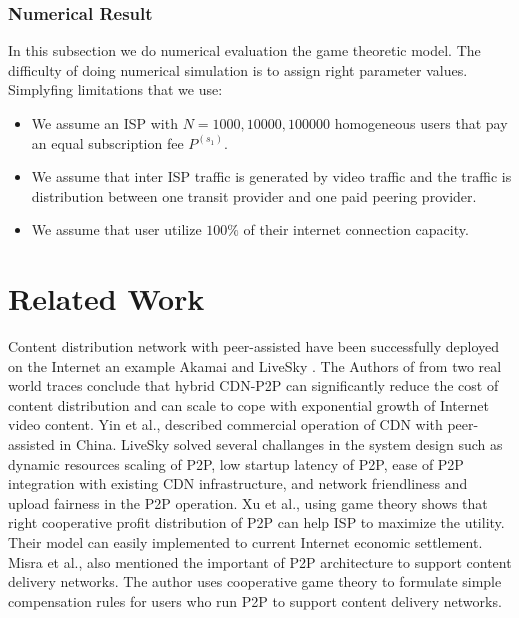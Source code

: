 \documentclass[paper]{ieice}
\begin{document}
\subsubsection{Numerical Result}
In this subsection we do numerical evaluation the game theoretic model. 
The difficulty of doing numerical simulation is to assign right parameter values.
Simplyfing limitations that we use: 
\begin{itemize}
	\item We assume an ISP with $N=1000,10000,100000$ homogeneous users that pay an equal subscription fee $P^{(s_1)}$.
	\item We assume that inter ISP traffic is generated by video traffic and the traffic is distribution between one transit provider and one paid peering provider.
	\item We assume that user utilize $100\%$ of their internet connection capacity.  
\end{itemize}


\section{Related Work} 
Content distribution network with peer-assisted have been successfully deployed on the Internet an example Akamai \cite{Huang:2008:UHC:1496046.1496064} and LiveSky \cite{Yin:2010:LEC:1823746.1823750}.
The Authors of \cite{Huang:2008:UHC:1496046.1496064} from two real world traces conclude that hybrid CDN-P2P can significantly reduce the cost of content distribution and can scale to cope with exponential growth of Internet video content.
Yin et al., \cite{Yin:2010:LEC:1823746.1823750} described commercial operation of CDN with peer-assisted in China.   
LiveSky solved several challanges in the system design such as dynamic resources scaling of P2P, low startup latency of P2P, ease of P2P integration with existing CDN infrastructure, and network friendliness and upload fairness in the P2P operation. 
Xu et al.,\cite{DBLP:journals/corr/abs-1212-4915} using game theory shows that right cooperative profit distribution of P2P can help ISP to maximize the utility. 
Their model can easily implemented to current Internet economic settlement.
Misra et al.,\cite{Misra:2010:IPS:1811099.1811064} also mentioned the important of P2P architecture to support content delivery networks. 
The author uses cooperative game theory to formulate simple compensation rules for users who run P2P to support content delivery networks.  
\end{document}
